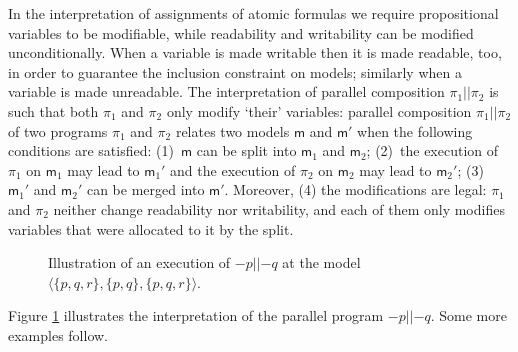 \documentclass{llncs}
\newcommand{\modl}{\mathsf m}
\newcommand{\pll}{ {||} }							%
\newcommand{\assgnbotV}[1]{{\mathtt {-} #1}}
\newcommand{\set}[1]{\{#1\}}
\newcommand{\tuple}[1]{ \langle #1 \rangle}
\begin{document}
In the interpretation of assignments of atomic formulas we require 
propositional variables to be modifiable, while 
readability and writability can be modified unconditionally.
When a variable is made writable then it is made readable, too, 
in order to guarantee the inclusion constraint on models; 
similarly when a variable is made unreadable. 
%
The interpretation of parallel composition $\pi_1 \pll \pi_2$ is such that both $\pi_1$ and $\pi_2$ only modify `their' variables: 
parallel composition $\pi_1 \pll \pi_2$ of two programs $\pi_1$ and $\pi_2$ 
relates two models $\modl$ and $\modl'$ when the following conditions are satisfied:
(1)~$\modl$ can be split into $\modl_1$ and $\modl_2$; 
(2)~the execution of $\pi_1$ on $\modl_1$ may lead to $\modl_1'$ and 
    the execution of $\pi_2$ on $\modl_2$ may lead to $\modl_2'$;
(3)~$\modl_1'$ and $\modl_2'$ can be merged into $\modl'$. 
Moreover, 
(4) the modifications are legal: $\pi_1$ and $\pi_2$ neither change readability nor writability, and 
each of them only modifies variables that were allocated to it by the split. 


\begin{figure}[t]
  \centering
  
\caption{Illustration of an execution of $\assgnbotV p \pll \assgnbotV q$ at the model $\tuple{ \set{p,q,r} , \set{p,q} , \set{p,q,r} } $. 
}
\label{fig:ex:parallel} 
\end{figure}

Figure \ref{fig:ex:parallel} illustrates the interpretation of the parallel program $\assgnbotV p \pll \assgnbotV q$. 
Some more examples follow. 
\end{document}
